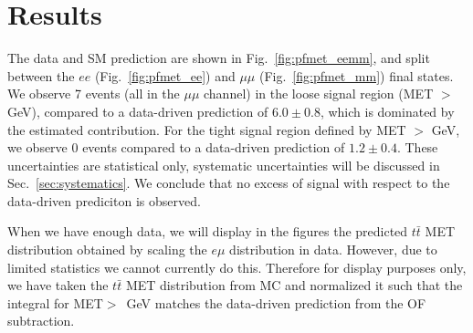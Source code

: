 
\section{Results}
\label{sec:results}

The data and SM prediction are shown in Fig.~\ref{fig:pfmet_eemm}, and split between the $ee$ (Fig.~\ref{fig:pfmet_ee})
and $\mu\mu$ (Fig.~\ref{fig:pfmet_mm}) final states. We observe 7  events (all in the $\mu\mu$ channel) in the loose signal 
region (MET $>$ \signalmetl GeV), compared to a data-driven prediction of $6.0 \pm 0.8$, which is dominated by the estimated 
\ttbar contribution. For the tight signal region defined by MET $>$ \signalmett GeV, we observe 0 events compared to a 
data-driven prediction of $1.2 \pm 0.4$. These uncertainties are statistical only, systematic uncertainties will be 
discussed in Sec.~\ref{sec:systematics}. We conclude that no excess of signal with respect to the data-driven prediciton is observed.

When we have enough data, we will display in the figures the predicted $t\bar{t}$ MET distribution obtained by scaling the $e\mu$ distribution
in data. However, due to limited statistics we cannot currently do this. Therefore for display purposes only, we have taken the
$t\bar{t}$ MET distribution from MC and normalized it such that the integral for MET$>$\signalmetl~GeV matches the data-driven prediction
from the OF subtraction. 



